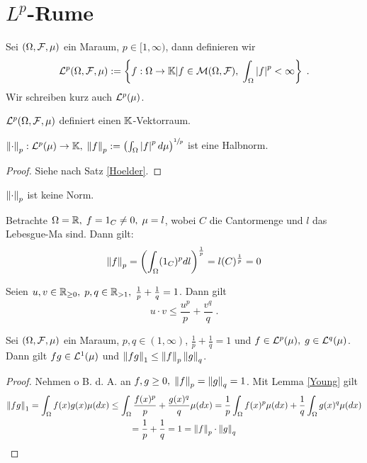 \section{$L^p$-R\as ume}

\begin{definition}
	Sei \((\Omega, \mathcal{F}, \mu)\) ein Ma\s raum, \(p\in [1,\infty)\), dann definieren wir
	\[\mathcal{L}^p(\Omega, \mathcal{F}, \mu) := \left\{f:\Omega \to \mathbb{K} \vert f\in \mathcal{M}(\Omega, \mathcal{F}), \; \int_\Omega \left\lvert f \right\rvert^p < \infty\right\}\;.\]
	Wir schreiben kurz auch \(\mathcal{L}^p(\mu)\).
\end{definition}
\begin{rem}
	\(\mathcal{L}^p(\Omega, \mathcal{F}, \mu)\) definiert einen $\mathbb{K}$-Vektorraum.
\end{rem}

\begin{theorem}
	\(\left\lVert\cdot\right\rVert_p: \mathcal{L}^p(\mu) \to \mathbb{K}, \; \left\lVert f\right\rVert_p := \left(\int_\Omega \left\lvert f \right\rvert^p d \mu\right)^{\sfrac{1}{p}}\) ist eine Halbnorm. \label{p_halbnorm}
\end{theorem}
\begin{proof}
	Siehe nach Satz \ref{Hoelder}.
\end{proof}
\begin{rem}
	\(\left\lVert\cdot\right\rVert_p\) ist keine Norm.
\end{rem}
\begin{ex}
	Betrachte \(\Omega = \mathbb{R},\; f = 1_C \neq 0 ,\; \mu = l\), wobei $C$ die Cantormenge und $l$ das Lebesgue-Ma\s{} sind. Dann gilt:
	\[\left\lVert f\right\rVert_p = \left(\int_\Omega (1_C)^p dl\right)^\frac 1p = l(C)^{\frac 1p} = 0\]
	
\end{ex}
\begin{lemma}
	Seien \(u,v \in \mathbb{R}_{\geq 0}, \; p, q \in \mathbb{R}_{>1}, \; \frac{1}{p} + \frac{1}{q} = 1\). Dann gilt
	\[u\cdot v \leq \frac{u^p}{p} + \frac{v^q}{q}\;.\]\label{Young}
\end{lemma}

\begin{theorem}
	Sei \((\Omega, \mathcal{F}, \mu)\) ein Ma\s raum, \(p, q \in (1,\infty)\), \(\frac{1}{p} + \frac{1}{q} = 1\) und \(f\in \mathcal{L}^p(\mu), \;g\in \mathcal{L}^q(\mu)\). Dann gilt \(fg \in \mathcal{L}^1(\mu)\) und \(\left\lVert fg\right\rVert_1 \leq \left\lVert f\right\rVert_p \left\lVert g\right\rVert_q\).
	\label{Hoelder}
\end{theorem}
\begin{proof}
	Nehmen o B. d. A. an \(f,g \geq 0, \; \left\lVert f\right\rVert_p = \left\lVert g\right\rVert_q = 1\). Mit Lemma \ref{Young} gilt
	\begin{multline*}\left\lVert fg\right\rVert_1 = \int_\Omega f(x) g(x) \mu(dx) \leq \int_\Omega \frac{f(x)^p}{p} + \frac{g(x)^q}{q}\mu(dx) = \frac{1}{p} \int_\Omega f(x)^p \mu(dx) + \frac{1}{q} \int_\Omega g(x)^q \mu(dx) \\= \frac{1}{p} + \frac{1}{q} = 1 = \left\lVert f\right\rVert_p \cdot \left\lVert g\right\rVert_q
	\end{multline*}
\end{proof}

